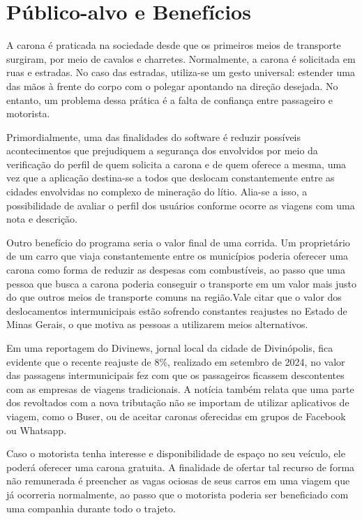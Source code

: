 \section{Público-alvo e Benefícios}


A carona é praticada na sociedade desde que os primeiros meios de transporte surgiram, por meio de cavalos e charretes. Normalmente, a carona é solicitada em ruas e estradas. No caso das estradas, utiliza-se um gesto universal: estender uma das mãos à frente do corpo com o polegar apontando na direção desejada. No entanto, um problema dessa prática é a falta de confiança entre passageiro e motorista.

Primordialmente, uma das finalidades do software é reduzir possíveis acontecimentos que prejudiquem a segurança dos envolvidos por meio da verificação do perfil de quem solicita a carona e de quem oferece a mesma, uma vez que a aplicação destina-se a todos que deslocam constantemente entre as cidades envolvidas no complexo de mineração do lítio. Alia-se a isso, a possibilidade de avaliar o perfil dos usuários conforme ocorre as viagens com uma nota e descrição. 

Outro benefício do programa seria o valor final de uma corrida. Um proprietário de um carro que viaja constantemente entre os municípios poderia oferecer uma carona como forma de reduzir as despesas com combustíveis, ao passo que uma pessoa que busca a carona poderia conseguir o transporte em um valor mais justo do que outros meios de transporte comuns na região.Vale citar que o valor dos deslocamentos intermunicipais estão sofrendo constantes reajustes no Estado de Minas Gerais, o que motiva as pessoas a utilizarem meios alternativos. 

Em uma reportagem do Divinews, jornal local da cidade de Divinópolis, fica evidente que o recente reajuste de 8\%, realizado em setembro de 2024, no valor das passagens intermunicipais fez com que os passageiros ficassem descontentes  com as empresas de viagens tradicionais. A notícia também relata que uma parte dos revoltados com a nova tributação não se importam de utilizar aplicativos de viagem, como o Buser, ou de aceitar caronas oferecidas em grupos de Facebook ou Whatsapp.

Caso o motorista tenha interesse e disponibilidade de espaço no seu veículo, ele poderá oferecer uma carona gratuita. A finalidade de ofertar tal recurso de forma não remunerada é preencher as vagas ociosas de seus carros em uma viagem que já ocorreria normalmente, ao passo que o motorista poderia ser beneficiado com uma companhia durante todo o trajeto.





